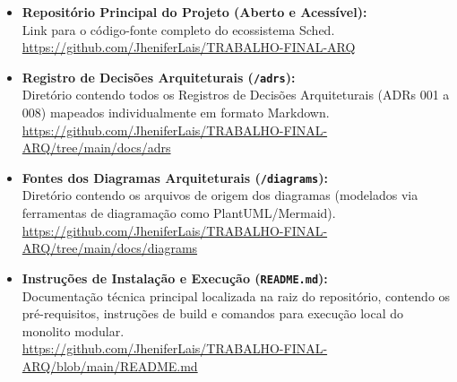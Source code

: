 \documentclass[12pt,a4paper]{article}
\begin{document}
\begin{itemize}
    \item \textbf{Repositório Principal do Projeto (Aberto e Acessível):} \\ 
    Link para o código-fonte completo do ecossistema Sched. \\
    \url{https://github.com/JheniferLais/TRABALHO-FINAL-ARQ}
    
    \item \textbf{Registro de Decisões Arquiteturais (\texttt{/adrs}):} \\ 
    Diretório contendo todos os Registros de Decisões Arquiteturais (ADRs 001 a 008) mapeados individualmente em formato Markdown. \\
    \url{https://github.com/JheniferLais/TRABALHO-FINAL-ARQ/tree/main/docs/adrs}
    
    \item \textbf{Fontes dos Diagramas Arquiteturais (\texttt{/diagrams}):} \\ 
    Diretório contendo os arquivos de origem dos diagramas (modelados via ferramentas de diagramação como PlantUML/Mermaid). \\
    \url{https://github.com/JheniferLais/TRABALHO-FINAL-ARQ/tree/main/docs/diagrams}
    
    \item \textbf{Instruções de Instalação e Execução (\texttt{README.md}):} \\ 
    Documentação técnica principal localizada na raiz do repositório, contendo os pré-requisitos, instruções de build e comandos para execução local do monolito modular. \\
    \url{https://github.com/JheniferLais/TRABALHO-FINAL-ARQ/blob/main/README.md}
\end{itemize}
\end{document}

